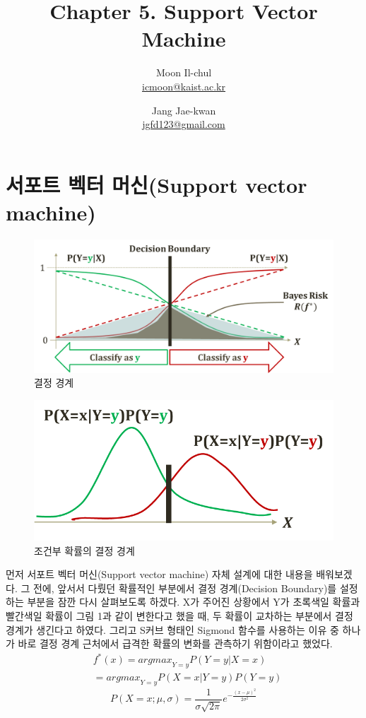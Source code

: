 \documentclass[a4paper]{oblivoir}
\author{Moon Il-chul \\ \href{mailto:icmoon@kaist.ac.kr}{icmoon@kaist.ac.kr} 
   \and Jang Jae-kwan \\ \href{mailto:jgfd123@gmail.com}{jgfd123@gmail.com} }
\title{Chapter 5. Support Vector Machine}
\begin{document}
\maketitle
\tableofcontents

\section{서포트 벡터 머신(Support vector machine)}

\begin{figure}[ht]\centering
\includegraphics[scale=0.5]{Decision_Boundary1}\caption{결정 경계}\label{Fig:5-1}
\end{figure}
\begin{figure}[ht]\centering
\includegraphics[scale=0.5]{Decision_Boundary2}\caption{조건부 확률의 결정 경계}\label{Fig:5-2}
\end{figure}
\indent 먼저 서포트 벡터 머신(Support vector machine) 자체 설계에 대한 내용을 배워보겠다. 그 전에, 앞서서 다뤘던 확률적인 부분에서 결정 경계(Decision Boundary)를 설정하는 부분을 잠깐 다시 살펴보도록 하겠다. X가 주어진 상황에서 Y가 초록색일 확률과 빨간색일 확률이 그림 1과 같이 변한다고 했을 때, 두 확률이 교차하는 부분에서 결정 경계가 생긴다고 하였다. 그리고 S커브 형태인 Sigmond 함수를 사용하는 이유 중 하나가 바로 결정 경계 근처에서 급격한 확률의 변화를 관측하기 위함이라고 했었다.  
\begin{equation}
\begin{split}
&f^*(x)={argmax}_{Y=y}P(Y=y|X=x)\\
&={argmax}_{Y=y} P(X=x|Y=y)P(Y=y)
\end{split}
\label{eq:5-1}
\end{equation}
\begin{equation}
P(X=x;\mu ,\sigma)=\frac{1}{\sigma\sqrt{2\pi}}e^{-\frac{(x-\mu)^2}{2\sigma^2}}
\label{eq:5-2}
\end{equation}
\end{document}

